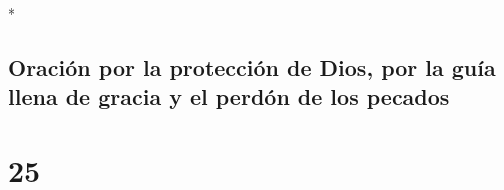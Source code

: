 \begin{paracol}{2}
\begin{otherlanguage}{english}
\end{otherlanguage}

\switchcolumn[0]*

\hypertarget{oraciuxf3n-por-la-protecciuxf3n-de-dios-por-la-guuxeda-llena-de-gracia-y-el-perduxf3n-de-los-pecados}{%
\subsection{Oración por la protección de Dios, por la guía llena de
gracia y el perdón de los
pecados}\label{oraciuxf3n-por-la-protecciuxf3n-de-dios-por-la-guuxeda-llena-de-gracia-y-el-perduxf3n-de-los-pecados}}

\hypertarget{section-48}{%
\section{25}\label{section-48}}


\end{paracol}
